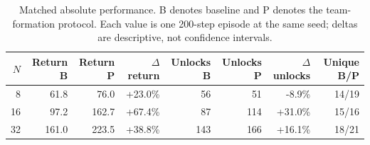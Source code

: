 \begin{table}[t]
\centering
\small
\setlength{\tabcolsep}{4pt}
\begin{tabular}{rrrrrrrr}
\toprule
$N$ & Return B & Return P & $\Delta$ return & Unlocks B & Unlocks P & $\Delta$ unlocks & Unique B/P \\
\midrule
8 & 61.8 & 76.0 & +23.0\% & 56 & 51 & -8.9\% & 14/19 \\
16 & 97.2 & 162.7 & +67.4\% & 87 & 114 & +31.0\% & 15/16 \\
32 & 161.0 & 223.5 & +38.8\% & 143 & 166 & +16.1\% & 18/21 \\
\bottomrule
\end{tabular}
\caption{Matched absolute performance. B denotes baseline and P denotes the team-formation protocol. Each value is one 200-step episode at the same seed; deltas are descriptive, not confidence intervals.}
\label{tab:matched-absolute}
\end{table}
